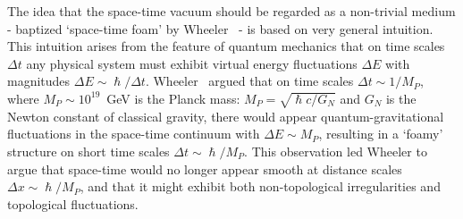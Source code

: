 \documentclass[12pt]{article}
\begin{document}
The idea that the space-time vacuum should
be regarded as a non-trivial medium - baptized `space-time foam' by Wheeler~\cite{Wheeler} - is based on very general intuition.
This intuition arises from the feature of quantum mechanics that on time scales $\Delta t$ any physical system must exhibit
virtual energy fluctuations $\Delta E$ with magnitudes $\Delta E \sim \hslash/\Delta t$. Wheeler~\cite{Wheeler} argued that on time
scales $\Delta t \sim 1/M_P$, where $M_P \sim 10^{19}$~GeV is the Planck mass: $M_P = \sqrt{\hslash c/G_N}$ and
$G_N$ is the Newton constant of classical gravity, there would appear quantum-gravitational fluctuations in
the space-time continuum with $\Delta E \sim M_P$, resulting in a `foamy'
structure on short time scales $\Delta t \sim \hslash/M_P$. This observation led
Wheeler to argue that space-time would no longer appear smooth at
distance scales $\Delta x \sim \hslash/M_P$, and that it might {exhibit} both non-topological irregularities and topological fluctuations.
\end{document}
